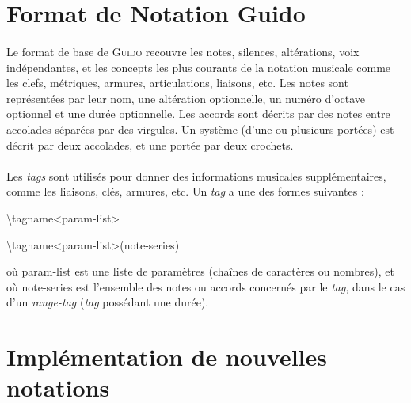 \documentclass[a4paper,10pt,twocolumn]{article}
\newenvironment{code}
  {\fontfamily{pnc}\selectfont}{}
\begin{document}
\section{Format de Notation Guido}


\paragraph{}
Le format de base de \textsc{Guido} recouvre les notes, silences, altérations, voix indépendantes, et les concepts les plus courants de la notation musicale comme les clefs, métriques, armures, articulations, liaisons, etc.
Les notes sont représentées par leur nom, une altération optionnelle, un numéro d’octave optionnel et une durée optionnelle. Les accords sont décrits par des notes entre accolades séparées par des virgules. Un système (d'une ou plusieurs portées) est décrit par deux accolades, et une portée par deux crochets.


\paragraph{}
Les \emph{tags} sont utilisés pour donner des informations musicales supplémentaires, comme les liaisons, clés, armures, etc. Un \emph{tag} a une des formes suivantes : 

\begin{code}
\textbackslash{}tagname\textless{}param-list\textgreater{}

\textbackslash{}tagname\textless{}param-list\textgreater{}(note-series)
\end{code}

où param-list est une liste de paramètres (chaînes de caractères ou nombres), et où note-series est l'ensemble des notes ou accords concernés par le \emph{tag}, dans le cas d'un \emph{range-tag} (\emph{tag} possédant une durée).

\section{Implémentation de nouvelles notations}
\end{document}
